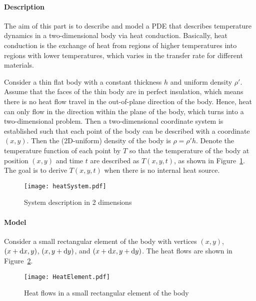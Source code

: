 

\paragraph{Description}
The aim of this part is to describe and model a PDE that describes temperature dynamics in a two-dimensional body via heat conduction.
Basically, heat conduction is the exchange of heat from regions of higher temperatures into regions with lower temperatures, which varies in the transfer rate for different materials.

Consider a thin flat body with a constant thickness $h$ and uniform density $\rho'$. Assume that the faces of the thin body are in perfect insulation, which means there is no heat flow travel in the out-of-plane direction of the body. Hence, heat can only flow in the direction within the plane of the body, which turns into a two-dimensional problem. Then a two-dimensional coordinate system is established such that each point of the body can be described with a coordinate $(x,y)$. Then the (2D-uniform) density of the body is $\rho = \rho' h$. Denote the temperature function of each point by $T$ so that the temperature of the body at position $(x,y)$ and time $t$ are described as $T(x,y,t)$, as shown in Figure~\ref{heatSystem.fig}. The goal is to derive $T(x,y,t)$ when there is no internal heat source.
\begin{figure}[htb]
	\centering
	\texttt{[image: heatSystem.pdf]}       
	\caption{System description in 2 dimensions}\label{heatSystem.fig}
\end{figure}

\paragraph{Model}
Consider a small rectangular element of the body with vertices $(x,y)$, $(x+\mathrm d x,y)$, $(x, y+\mathrm d y)$, and $(x+\mathrm d x, y+\mathrm d y)$. The heat flows are shown in Figure~\ref{heatElement.fig}.
\begin{figure}[htb]
	\centering
	\texttt{[image: HeatElement.pdf]}       
	\caption{Heat flows in a small rectangular element of the body}\label{heatElement.fig}
\end{figure}

